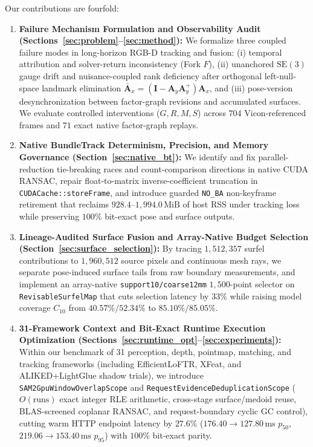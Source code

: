 \documentclass[10pt,journal]{IEEEtran}
\begin{document}
Our contributions are fourfold:
\begin{enumerate}
    \item \textbf{Failure Mechanism Formulation and Observability Audit (Sections~\ref{sec:problem}--\ref{sec:method}):} We formalize three coupled failure modes in long-horizon RGB-D tracking and fusion: (i) temporal attribution and solver-return inconsistency (Fork $F$), (ii) unanchored $\mathrm{SE}(3)$ gauge drift and nuisance-coupled rank deficiency after orthogonal left-null-space landmark elimination $\bar{\mathbf{A}}_x=(\mathbf{I}-\mathbf{A}_y\mathbf{A}_y^+)\mathbf{A}_x$, and (iii) pose-version desynchronization between factor-graph revisions and accumulated surfaces. We evaluate controlled interventions ($G,R,M,S$) across $704$ Vicon-referenced frames and $71$ exact native factor-graph replays.
    \item \textbf{Native BundleTrack Determinism, Precision, and Memory Governance (Section~\ref{sec:native_bt}):} We identify and fix parallel-reduction tie-breaking races and count-comparison directions in native CUDA RANSAC, repair float-to-matrix inverse-coefficient truncation in \texttt{CUDACache::storeFrame}, and introduce guarded \texttt{NO\_BA} non-keyframe retirement that reclaims $928.4$--$1{,}994.0\,\mathrm{MiB}$ of host RSS under tracking loss while preserving $100\%$ bit-exact pose and surface outputs.
    \item \textbf{Lineage-Audited Surface Fusion and Array-Native Budget Selection (Section~\ref{sec:surface_selection}):} By tracing $1{,}512{,}357$ surfel contributions to $1{,}960{,}512$ source pixels and continuous mesh rays, we separate pose-induced surface tails from raw boundary measurements, and implement an array-native \texttt{support10/coarse12mm} $1{,}500$-point selector on \texttt{RevisableSurfelMap} that cuts selection latency by $33\%$ while raising model coverage $C_{10}$ from $40.57\%/52.34\%$ to $85.10\%/85.05\%$.
    \item \textbf{31-Framework Context and Bit-Exact Runtime Execution Optimization (Sections~\ref{sec:runtime_opt}--\ref{sec:experiments}):} Within our benchmark of 31 perception, depth, pointmap, matching, and tracking frameworks (including EfficientLoFTR, XFeat, and ALIKED+LightGlue shadow trials), we introduce \texttt{SAM2GpuWindowOverlapScope} and \texttt{RequestEvidenceDeduplicationScope} ($O(\text{runs})$ exact integer RLE arithmetic, cross-stage surface/medoid reuse, BLAS-screened coplanar RANSAC, and request-boundary cyclic GC control), cutting warm HTTP endpoint latency by $27.6\%$ ($176.40\to 127.80\,\mathrm{ms}$ $p_{50}$, $219.06\to 153.40\,\mathrm{ms}$ $p_{95}$) with $100\%$ bit-exact parity.
\end{enumerate}
\end{document}
